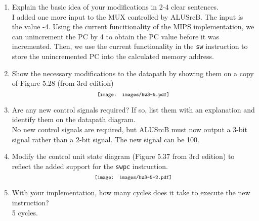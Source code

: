 \documentclass[10pt,letterpaper]{article}
\begin{document}
\begin{enumerate}[label=\Alph*)]
\item Explain the basic idea of your modifications in 2-4 clear sentences.\\
I added one more input to the MUX controlled by ALUSrcB. The input is the value -4. Using the current funcitionality of the MIPS implementation, we can unincrement the PC by 4 to obtain the PC value before it was incremented. Then, we use the current functionality in the \texttt{sw} instruction to store the unincremented PC into the calculated memory address.
\item Show the necessary modifications to the datapath by showing them on a copy of Figure 5.28 (from 3rd edition)
\[
\scalebox{0.75}{
\texttt{[image: images/hw3-5.pdf]}
}\]
\item Are any new control signals required? If so, list them with an explanation and identify them on the datapath diagram.\\
No new control signals are required, but ALUSrcB must now output a 3-bit signal rather than a 2-bit signal. The new signal can be 100. 
\item Modify the control unit state diagram (Figure 5.37 from 3rd edition) to reflect the added support for the \texttt{swpc} instruction.\\
\[
\scalebox{0.75}{
\texttt{[image: images/hw3-5-2.pdf]}
}\]
\item With your implementation, how many cycles does it take to execute the new instruction?\\
5 cycles.
\end{enumerate}
\end{document}
